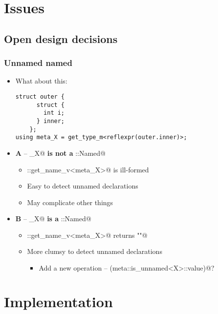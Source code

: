 \documentclass[compress,table,xcolor=table]{beamer}
\begin{document}
\section{Issues}

\subsection{Open design decisions}
\begin{frame}[fragile]
\frametitle{Unnamed named}
  \begin{itemize}
    \item What about this:
    \begin{lstlisting}[basicstyle=\footnotesize\ttfamily]
	struct outer {
	  struct {
	    int i;
	  } inner;
	};
using meta_X = get_type_m<reflexpr(outer.inner)>;
    \end{lstlisting}
    \item {\bf A} -- \verb@meta_X@ \textbf{is not a} \verb@meta::Named@
    \begin{itemize}
      \small
      \item \verb@meta::get_name_v<meta_X>@ is ill-formed
      \item Easy to detect unnamed declarations
      \item May complicate other things
    \end{itemize}
    \item {\bf B} -- \verb@meta_X@ \textbf{is a} \verb@meta::Named@
    \begin{itemize}
      \small
      \item \verb@meta::get_name_v<meta_X>@ returns \verb@""@
      \item More clumsy to detect unnamed declarations
      \begin{itemize}
        \item Add a new operation -- \verb@bool(meta::is_unnamed<X>::value)@?
      \end{itemize}
    \end{itemize}
  \end{itemize}
\end{frame}

\section{Implementation}
\end{document}
